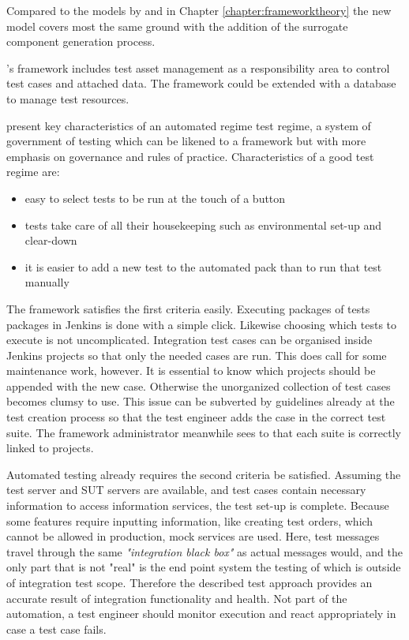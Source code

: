 \documentclass[12pt,a4paper,oneside,pdftex]{report}
\begin{document}
{Compared to the models by \citet{liu2009unified} and \citet{huang2008surrogate} in Chapter \ref{chapter:frameworktheory} the new model covers most the same ground with the addition of the surrogate component generation process. 

\citeauthor{laukkanen2006data}'s \citeyearpar{laukkanen2006data} framework includes test asset management as a responsibility area to control test cases and attached data. The framework could be extended with a database to manage test resources.

\citet{fewster1999software} present key characteristics of an automated regime test regime, a system of government of testing which can be likened to a framework but with more emphasis on governance and rules of practice. Characteristics of a good test regime are:
\begin{itemize}
\item easy to select tests to be run at the touch of a button
\item tests take care of all their housekeeping such as environmental set-up and clear-down
\item it is easier to add a new test to the automated pack than to run that test manually
\end{itemize}

The framework satisfies the first criteria easily. Executing packages of tests packages in Jenkins is done with a simple click. Likewise choosing which tests to execute is not uncomplicated. Integration test cases can be organised inside Jenkins projects so that only the needed cases are run. This does call for some maintenance work, however. It is essential to know which projects should be appended with the new case. Otherwise the unorganized collection of test cases becomes clumsy to use. This issue can be subverted by guidelines already at the test creation process so that the test engineer adds the case in the correct test suite. The framework administrator meanwhile sees to that each suite is correctly linked to projects.

Automated testing already requires the second criteria be satisfied. Assuming the test server and SUT servers are available, and test cases contain necessary information to access information services, the test set-up is complete. Because some features require inputting information, like creating test orders, which cannot be allowed in production, mock services are used. Here, test messages travel through the same \emph{"integration black box"} as actual messages would, and the only part that is not "real" is the end point system the testing of which is outside of integration test scope. Therefore the described test approach provides an accurate result of integration functionality and health. Not part of the automation, a test engineer should monitor execution and react appropriately in case a test case fails.

}
\end{document}

